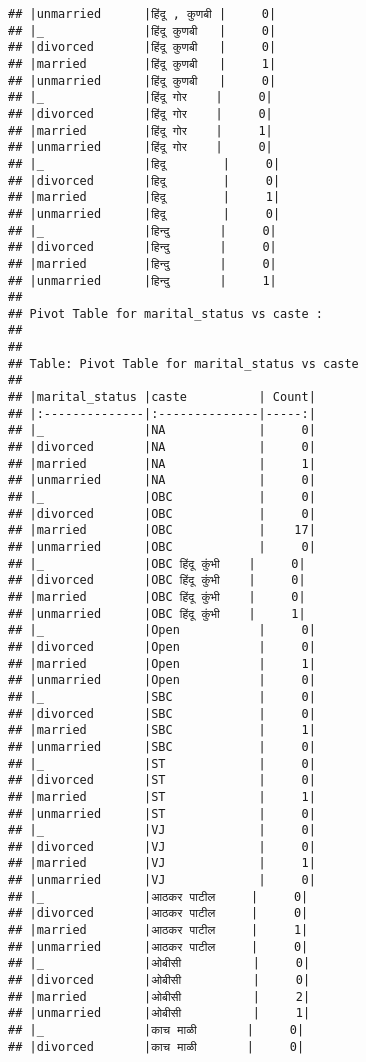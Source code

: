 \documentclass[
]{article}
\begin{document}
\begin{verbatim}
## |unmarried      |हिंदू , कुणबी |     0|
## |_              |हिंदू कुणबी   |     0|
## |divorced       |हिंदू कुणबी   |     0|
## |married        |हिंदू कुणबी   |     1|
## |unmarried      |हिंदू कुणबी   |     0|
## |_              |हिंदू गोर    |     0|
## |divorced       |हिंदू गोर    |     0|
## |married        |हिंदू गोर    |     1|
## |unmarried      |हिंदू गोर    |     0|
## |_              |हिदू        |     0|
## |divorced       |हिदू        |     0|
## |married        |हिदू        |     1|
## |unmarried      |हिदू        |     0|
## |_              |हिन्दु       |     0|
## |divorced       |हिन्दु       |     0|
## |married        |हिन्दु       |     0|
## |unmarried      |हिन्दु       |     1|
## 
## Pivot Table for marital_status vs caste :
## 
## 
## Table: Pivot Table for marital_status vs caste
## 
## |marital_status |caste          | Count|
## |:--------------|:--------------|-----:|
## |_              |NA             |     0|
## |divorced       |NA             |     0|
## |married        |NA             |     1|
## |unmarried      |NA             |     0|
## |_              |OBC            |     0|
## |divorced       |OBC            |     0|
## |married        |OBC            |    17|
## |unmarried      |OBC            |     0|
## |_              |OBC हिंदू कुंभी    |     0|
## |divorced       |OBC हिंदू कुंभी    |     0|
## |married        |OBC हिंदू कुंभी    |     0|
## |unmarried      |OBC हिंदू कुंभी    |     1|
## |_              |Open           |     0|
## |divorced       |Open           |     0|
## |married        |Open           |     1|
## |unmarried      |Open           |     0|
## |_              |SBC            |     0|
## |divorced       |SBC            |     0|
## |married        |SBC            |     1|
## |unmarried      |SBC            |     0|
## |_              |ST             |     0|
## |divorced       |ST             |     0|
## |married        |ST             |     1|
## |unmarried      |ST             |     0|
## |_              |VJ             |     0|
## |divorced       |VJ             |     0|
## |married        |VJ             |     1|
## |unmarried      |VJ             |     0|
## |_              |आठकर पाटील     |     0|
## |divorced       |आठकर पाटील     |     0|
## |married        |आठकर पाटील     |     1|
## |unmarried      |आठकर पाटील     |     0|
## |_              |ओबीसी          |     0|
## |divorced       |ओबीसी          |     0|
## |married        |ओबीसी          |     2|
## |unmarried      |ओबीसी          |     1|
## |_              |काच माळी       |     0|
## |divorced       |काच माळी       |     0|

\end{verbatim}
\end{document}
